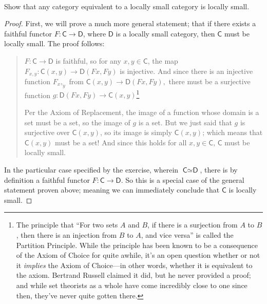 \documentclass[../../main]{subfiles}
\begin{document}
\paragraph{}
\begin{exercise}
	Show that any category equivalent to a locally small category is locally
	small.
\end{exercise}

\begin{proof}
	First, we will prove a much more general statement; that if there exists a
	faithful functor \(F \colon \textsf{C} \to \textsf{D}\), where
	\(\textsf{D}\) is a locally small category, then \(\textsf{C}\) must be
	locally small. The proof follows:

\begin{quotation}
	\(F \colon \textsf{C} \to \textsf{D}\) is faithful, so for any \(x, y \in
	\textsf{C}\), the map \(F_{x,y} \colon \textsf{C}(x, y) \to \textsf{D}(Fx,
	Fy)\) is injective. And since there is an injective function \(F_x,_y\) from
	\(\textsf{C}(x, y) \to \textsf{D}(Fx, Fy),\) there must be a surjective
	function \(g \colon \textsf{D}(Fx, Fy) \to \textsf{C}(x,
	y)\)\footnote{The principle that ``For two sets $A$ and $B$, if there is a
		surjection from $A$ to $B$, then there is an injection from $B$ to $A$,
		and vice versa''
		is called the Partition Principle. While the principle has been known to be a
		consequence of the Axiom of Choice for quite awhile, it's an open question
		whether or not it \textit{implies} the Axiom of Choice---in other words,
		whether it is equivalent to the axiom. Bertrand Russell claimed it did, but he
		never provided a proof; and while set theorists as a whole have come incredibly
	close to one since then, they've never quite gotten there.}

	Per the Axiom of Replacement, the image of a function whose domain is a set
	must be a set, so the image of \(g\) is a set. But we just said that \(g\)
	is surjective over \(\textsf{C}(x, y)\), so its image is simply
	\(\textsf{C}(x, y)\); which means that \(\textsf{C}(x, y)\) must be a set!
	And since this holds for all \(x, y \in \textsf{C}\), \(\textsf{C}\) must be
	locally small.
\end{quotation}

In the particular case specified by the exercise, wherein \(\textsf{C} \simeq
\textsf{D}\), there is by definition a faithful functor \(F \colon \textsf{C}
\to \textsf{D}\). So this is a special case of the general statement proven
above; meaning we can immediately conclude that \(\textsf{C}\) is locally small.
\end{proof}
\end{document}
